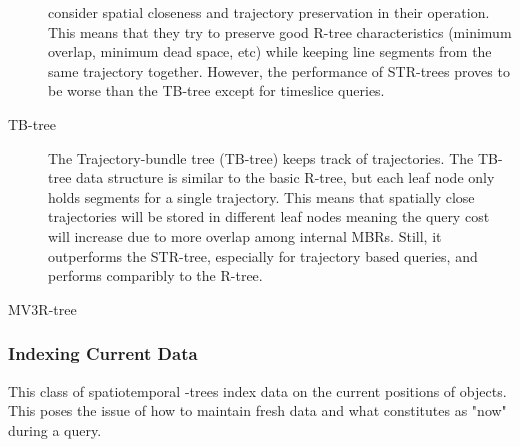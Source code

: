 \begin{description}
	consider spatial closeness and trajectory preservation in their operation.
	This means that they try to preserve good R-tree characteristics (minimum 
	overlap, minimum dead space, etc) while keeping line segments from the 
	same trajectory together. However, the performance of STR-trees proves to
	be worse than the TB-tree except for timeslice queries.
	\item[TB-tree] The Trajectory-bundle tree (TB-tree) \cite{pfoser2000novel}
	keeps track of trajectories. The TB-tree data structure is similar to the 
	basic R-tree, but each leaf node only holds segments for a single 
	trajectory. This means that spatially close trajectories will be stored in 
	different leaf nodes meaning the query cost will increase due to more 
	overlap among internal MBRs. Still, it outperforms the STR-tree, especially
	for trajectory based queries, and performs comparibly to the R-tree. 
	\item[MV3R-tree] \cite{tao2001mv3r}
\end{description}

\subsubsection{Indexing Current Data}
This class of spatiotemporal \rbase-trees index data on the current positions of 
objects. This poses the issue of how to maintain fresh data and what constitutes 
as "now" during a query. 

